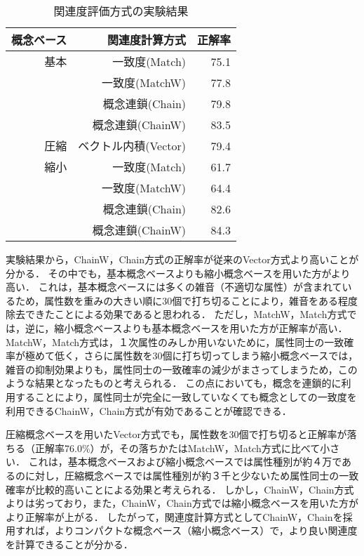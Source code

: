 \begin{table}[tb]
\renewcommand{\arraystretch}{}
\caption[]{関連度評価方式の実験結果}
\label{Result1}
\begin{center}
\begin{tabular}{r|r|r}
概念ベース  & 関連度計算方式       & 正解率  \\ \hline
基本        & 一致度(Match)        &  75.1 \\ 
            & 一致度(MatchW)       &  77.8 \\ 
            & 概念連鎖(Chain)      &  79.8 \\
            & 概念連鎖(ChainW)     &  83.5 \\ \hline
圧縮        & ベクトル内積(Vector) &  79.4 \\ \hline
縮小        & 一致度(Match)        &  61.7 \\ 
            & 一致度(MatchW)       &  64.4 \\ 
            & 概念連鎖(Chain)      &  82.6 \\
            & 概念連鎖(ChainW)     &  84.3 \\ \hline
\end{tabular}
\end{center}
\end{table}

実験結果から，ChainW，Chain方式の正解率が従来のVector方式より高いことが分かる．
その中でも，基本概念ベースよりも縮小概念ベースを用いた方がより高い．
これは，基本概念ベースには多くの雑音（不適切な属性）が含まれているため，属性数を重みの大きい順に30個で打ち切ることにより，雑音をある程度除去できたことによる効果であると思われる．
ただし，MatchW，Match方式では，逆に，縮小概念ベースよりも基本概念ベースを用いた方が正解率が高い．
MatchW，Match方式は，１次属性のみしか用いないために，属性同士の一致確率が極めて低く，さらに属性数を30個に打ち切ってしまう縮小概念ベースでは，雑音の抑制効果よりも，属性同士の一致確率の減少がまさってしまうため，このような結果となったものと考えられる．
この点においても，概念を連鎖的に利用することにより，属性同士が完全に一致していなくても概念としての一致度を利用できるChainW，Chain方式が有効であることが確認できる．

圧縮概念ベースを用いたVector方式でも，属性数を30個で打ち切ると正解率が落ちる（正解率76.0\%）が，その落ちかたはMatchW，Match方式に比べて小さい．
これは，基本概念ベースおよび縮小概念ベースでは属性種別が約４万であるのに対し，圧縮概念ベースでは属性種別が約３千と少ないため属性同士の一致確率が比較的高いことによる効果と考えられる．
しかし，ChainW，Chain方式よりは劣っており，また，ChainW，Chain方式では縮小概念ベースを用いた方がより正解率が上がる．
したがって，関連度計算方式としてChainW，Chainを採用すれば，よりコンパクトな概念ベース（縮小概念ベース）で，より良い関連度を計算できることが分かる．

